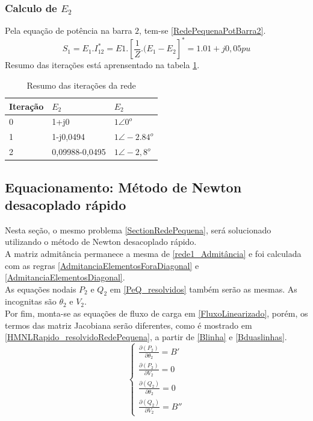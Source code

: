 \subsubsection{Calculo de $E_2$}
Pela equação de potência na barra $2$, tem-se \ref{RedePequenaPotBarra2}.
\begin{equation}
    S_1 = E_1.I^*_12=E1.[\frac{1}{Z}.(E_1-E_2]^*= 1.01+j0,05pu
    \label{RedePequenaPotBarra2}
\end{equation}
Resumo das iterações está aprensentado na tabela \ref{t_redePequenaResumo}.
\begin{table}[!htb]
\centering
\caption{Resumo das iterações da rede}
\begin{tabular}{lll}
\hline
Iteração & $E_2$          & $E_2$ \\ \hline
0        & 1+j0           & $1\angle 0^o$ \\
1        & 1-j0,0494      & $1 \angle -2.84^o$ \\
2        & 0,09988-0,0495 & $1 \angle -2,8^o$ \\ \hline
\end{tabular}
\label{t_redePequenaResumo}
\end{table}

\subsection{Equacionamento: Método de Newton desacoplado rápido}
Nesta seção, o mesmo problema \ref{SectionRedePequena}, será solucionado utilizando o método de Newton desacoplado rápido.\\
A matriz admitância permanece a mesma de \ref{rede1_Admitância} e foi calculada com as regras \ref{AdmitanciaElementosForaDiagonal} e \ref{AdmitanciaElementosDiagonal}.\\
As equações nodais $P_2$ e $Q_2$ em \ref{PeQ_resolvidos} também serão as mesmas. As incognitas são $\theta_2$ e $V_2$.\\
Por fim, monta-se as equações de fluxo de carga em \ref{FluxoLinearizado}, porém, os termos das matriz Jacobiana serão diferentes, como é mostrado em \ref{HMNLRapido_resolvidoRedePequena}, a partir de \ref{Blinha} e \ref{Bduaslinhas}.
\begin{equation}
  \left\{    \begin{array}{llll}
                \frac{\partial (P_2)}{\partial \theta_2} = B'\\
                \frac{\partial (P_2)}{\partial V_2} = 0\\
                \frac{\partial (Q_2)}{\partial \theta_2} =0\\
                \frac{\partial (Q_2)}{\partial V_2} =B''
            \end{array}\right.
    \label{HMNLRapido_resolvidoRedePequena}
\end{equation}



